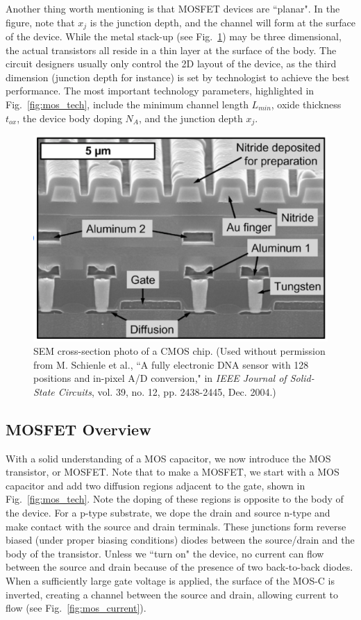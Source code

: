 Another thing worth mentioning is that MOSFET devices are ``planar".  In the figure, note that $x_j$ is the junction depth, and the channel will form at the surface of the device.  While the metal stack-up (see Fig.~\ref{fig:cmos_photo}) may be three dimensional, the actual transistors all reside in a thin layer at the surface of the body.  The circuit designers usually only control the 2D layout of the device, as the third dimension (junction depth for instance) is set by technologist to achieve the best performance.  The most important technology parameters, highlighted in Fig.~\ref{fig:mos_tech}, include the minimum channel length $L_{min}$, oxide thickness $t_{ox}$, the device body doping $N_A$, and the junction depth $x_j$.
 
 
\begin{figure}[tb]
\begin{center}
\includegraphics[width=.65\columnwidth]{cmos_xsection_photo.png}
\end{center}
\caption{SEM cross-section photo of a CMOS chip. {\small(Used without permission from M. Schienle et al., ``A fully electronic DNA sensor with 128 positions and in-pixel A/D conversion," in \emph{IEEE Journal of Solid-State Circuits}, vol. 39, no. 12, pp. 2438-2445, Dec. 2004.)}} \label{fig:cmos_photo}
\end{figure}

\subsection{MOSFET Overview}


With a solid understanding of a MOS capacitor, we now introduce the MOS transistor, or MOSFET.  Note that to make a MOSFET, we start with a MOS capacitor and add two diffusion regions adjacent to the gate, shown in Fig.~\ref{fig:mos_tech}.  Note the doping of these regions is opposite to the body of the device.  For a p-type substrate, we dope the drain and source n-type and make contact with the source and drain terminals.  These junctions form reverse biased (under proper biasing conditions) diodes between the source/drain and the body of the transistor.  Unless we ``turn on" the device, no current can flow between the source and drain because of the presence of two back-to-back diodes.  When a sufficiently large gate voltage is applied, the surface of the MOS-C is inverted, creating a channel between the source and drain, allowing current to flow (see Fig.~\ref{fig:mos_current}).    

